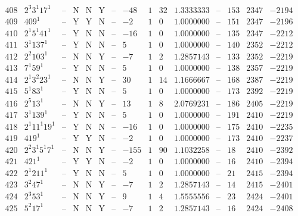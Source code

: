 \documentclass[11pt,reqno,a4letter]{article}
\numberwithin{figure}{section}
\numberwithin{table}{section}
\theoremstyle{plain}
\numberwithin{theorem}{section}
\theoremstyle{definition}
\begin{document}
\begin{table}[h!]
\begin{equation*}
{\begin{array}{|cc|c|ccc|c|c|ccc|c|ccc}
 408 & 2^3 3^1 17^1 & \text{--} & \text{N} & \text{N} & \text{Y} & \text{--} & -48 & 1 & 32 & 1.3333333 & \text{--} & 153 & 2347 & -2194 \\
 409 & 409^1 & \text{--} & \text{Y} & \text{Y} & \text{N} & \text{--} & -2 & 1 & 0 & 1.0000000 & \text{--} & 151 & 2347 & -2196 \\
 410 & 2^1 5^1 41^1 & \text{--} & \text{Y} & \text{N} & \text{N} & \text{--} & -16 & 1 & 0 & 1.0000000 & \text{--} & 135 & 2347 & -2212 \\
 411 & 3^1 137^1 & \text{--} & \text{Y} & \text{N} & \text{N} & \text{--} & 5 & 1 & 0 & 1.0000000 & \text{--} & 140 & 2352 & -2212 \\
 412 & 2^2 103^1 & \text{--} & \text{N} & \text{N} & \text{Y} & \text{--} & -7 & 1 & 2 & 1.2857143 & \text{--} & 133 & 2352 & -2219 \\
 413 & 7^1 59^1 & \text{--} & \text{Y} & \text{N} & \text{N} & \text{--} & 5 & 1 & 0 & 1.0000000 & \text{--} & 138 & 2357 & -2219 \\
 414 & 2^1 3^2 23^1 & \text{--} & \text{N} & \text{N} & \text{Y} & \text{--} & 30 & 1 & 14 & 1.1666667 & \text{--} & 168 & 2387 & -2219 \\
 415 & 5^1 83^1 & \text{--} & \text{Y} & \text{N} & \text{N} & \text{--} & 5 & 1 & 0 & 1.0000000 & \text{--} & 173 & 2392 & -2219 \\
 416 & 2^5 13^1 & \text{--} & \text{N} & \text{N} & \text{Y} & \text{--} & 13 & 1 & 8 & 2.0769231 & \text{--} & 186 & 2405 & -2219 \\
 417 & 3^1 139^1 & \text{--} & \text{Y} & \text{N} & \text{N} & \text{--} & 5 & 1 & 0 & 1.0000000 & \text{--} & 191 & 2410 & -2219 \\
 418 & 2^1 11^1 19^1 & \text{--} & \text{Y} & \text{N} & \text{N} & \text{--} & -16 & 1 & 0 & 1.0000000 & \text{--} & 175 & 2410 & -2235 \\
 419 & 419^1 & \text{--} & \text{Y} & \text{Y} & \text{N} & \text{--} & -2 & 1 & 0 & 1.0000000 & \text{--} & 173 & 2410 & -2237 \\
 420 & 2^2 3^1 5^1 7^1 & \text{--} & \text{N} & \text{N} & \text{Y} & \text{--} & -155 & 1 & 90 & 1.1032258 & \text{--} & 18 & 2410 & -2392 \\
 421 & 421^1 & \text{--} & \text{Y} & \text{Y} & \text{N} & \text{--} & -2 & 1 & 0 & 1.0000000 & \text{--} & 16 & 2410 & -2394 \\
 422 & 2^1 211^1 & \text{--} & \text{Y} & \text{N} & \text{N} & \text{--} & 5 & 1 & 0 & 1.0000000 & \text{--} & 21 & 2415 & -2394 \\
 423 & 3^2 47^1 & \text{--} & \text{N} & \text{N} & \text{Y} & \text{--} & -7 & 1 & 2 & 1.2857143 & \text{--} & 14 & 2415 & -2401 \\
 424 & 2^3 53^1 & \text{--} & \text{N} & \text{N} & \text{Y} & \text{--} & 9 & 1 & 4 & 1.5555556 & \text{--} & 23 & 2424 & -2401 \\
 425 & 5^2 17^1 & \text{--} & \text{N} & \text{N} & \text{Y} & \text{--} & -7 & 1 & 2 & 1.2857143 & \text{--} & 16 & 2424 & -2408 \\
\end{array}
}
\end{equation*}


\end{table}
\end{document}
